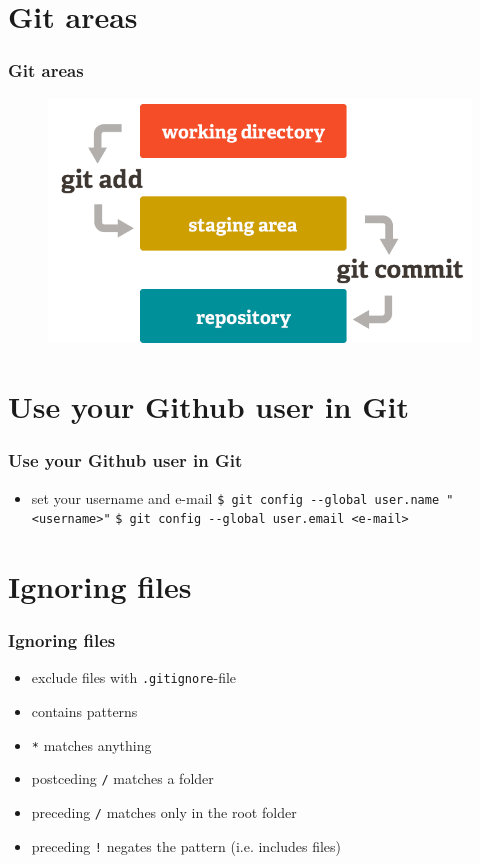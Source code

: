 \documentclass{beamer}
\begin{document}
	\section{Git areas}
	\begin{frame}
		\frametitle{Git areas}
		\begin{figure}[h]
			\centering
			\includegraphics[width=.9\linewidth]{images/git-areas.png}
			\label{fig1}
		\end{figure}
	\end{frame}

	\section{Use your Github user in Git}
	\begin{frame}
		\frametitle{Use your Github user in Git}\pause
		\begin{itemize}
			\item set your username and e-mail \newline
			\lstinline|$ git config --global user.name "<username>"|\newline
			\lstinline|$ git config --global user.email <e-mail>|\newline
		\end{itemize}
	\end{frame}

	\section{Ignoring files}
	\begin{frame}
		\frametitle{Ignoring files}\pause
		\begin{itemize}
			\item exclude files with \lstinline|.gitignore|-file \pause
			\item contains patterns \pause
			\item \lstinline|*| matches anything \pause
			\item postceding \lstinline|/| matches a folder \pause
			\item preceding \lstinline|/| matches only in the root folder \pause
			\item preceding \lstinline|!| negates the pattern (i.e. includes files)
		\end{itemize}
	\end{frame}
\end{document}
